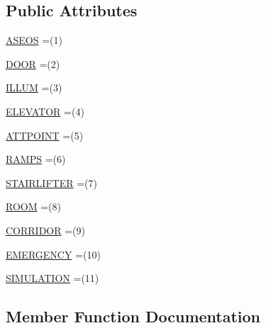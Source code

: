 \subsection*{Public Attributes}
\begin{DoxyCompactItemize}
\item 
\mbox{\hyperlink{enumcom_1_1osoc_1_1oncera_1_1_types_manager_1_1obs_type_a2c18ba9c4227c644c20c03005ffa6064}{A\+S\+E\+OS}} =(1)
\item 
\mbox{\hyperlink{enumcom_1_1osoc_1_1oncera_1_1_types_manager_1_1obs_type_a4184d20c47dbc60ba47a87820fae0881}{D\+O\+OR}} =(2)
\item 
\mbox{\hyperlink{enumcom_1_1osoc_1_1oncera_1_1_types_manager_1_1obs_type_a5df3dc28a12a25bdd33d60262eff118e}{I\+L\+L\+UM}} =(3)
\item 
\mbox{\hyperlink{enumcom_1_1osoc_1_1oncera_1_1_types_manager_1_1obs_type_a3a03ed6f0b55ec4e61d611ebe794e2f8}{E\+L\+E\+V\+A\+T\+OR}} =(4)
\item 
\mbox{\hyperlink{enumcom_1_1osoc_1_1oncera_1_1_types_manager_1_1obs_type_a7c24b53eacb9f25a1fc6eaeed8db106d}{A\+T\+T\+P\+O\+I\+NT}} =(5)
\item 
\mbox{\hyperlink{enumcom_1_1osoc_1_1oncera_1_1_types_manager_1_1obs_type_aad548605b9fc594c80e550ffef6b224c}{R\+A\+M\+PS}} =(6)
\item 
\mbox{\hyperlink{enumcom_1_1osoc_1_1oncera_1_1_types_manager_1_1obs_type_ae0db4dea7eb496c8f3b059f03765bd62}{S\+T\+A\+I\+R\+L\+I\+F\+T\+ER}} =(7)
\item 
\mbox{\hyperlink{enumcom_1_1osoc_1_1oncera_1_1_types_manager_1_1obs_type_aa38a7c3370945a540604ac27d20fb103}{R\+O\+OM}} =(8)
\item 
\mbox{\hyperlink{enumcom_1_1osoc_1_1oncera_1_1_types_manager_1_1obs_type_a6232ebc58d14367b4e02f5bbd5260fed}{C\+O\+R\+R\+I\+D\+OR}} =(9)
\item 
\mbox{\hyperlink{enumcom_1_1osoc_1_1oncera_1_1_types_manager_1_1obs_type_aded995aed66b6853c4549785c51c086f}{E\+M\+E\+R\+G\+E\+N\+CY}} =(10)
\item 
\mbox{\hyperlink{enumcom_1_1osoc_1_1oncera_1_1_types_manager_1_1obs_type_a3b75f776c3ad5d9f8b1380d4d07fe963}{S\+I\+M\+U\+L\+A\+T\+I\+ON}} =(11)
\end{DoxyCompactItemize}


\subsection{Member Function Documentation}
\mbox{\label{enumcom_1_1osoc_1_1oncera_1_1_types_manager_1_1obs_type_a1a34698e0ca18dc96f28870d834511ef}} 
